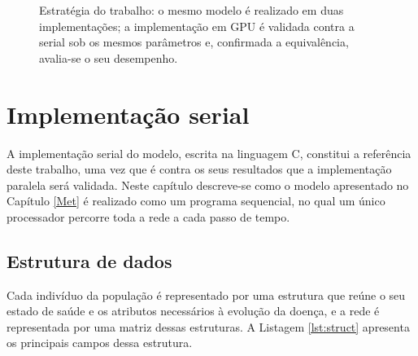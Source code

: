 \documentclass[
	12pt,				%
	openright,			%
	oneside,			%
	a4paper,			%
	english,			%
	french,				%
	spanish,			%
	brazil				%
	]{abntex2}
\begin{document}
\begin{figure}[H]
\centering
{}
\caption{Estratégia do trabalho: o mesmo modelo é realizado em duas implementações; a implementação em GPU é validada contra a serial sob os mesmos parâmetros e, confirmada a equivalência, avalia-se o seu desempenho.}
\label{fig:estrategia}
\end{figure}

\chapter{Implementação serial}
\label{cap:serial}

A implementação serial do modelo, escrita na linguagem C, constitui a referência deste trabalho, uma vez que é contra os seus resultados que a implementação paralela será validada. Neste capítulo descreve-se como o modelo apresentado no Capítulo \ref{Met} é realizado como um programa sequencial, no qual um único processador percorre toda a rede a cada passo de tempo.

\section{Estrutura de dados}

Cada indivíduo da população é representado por uma estrutura que reúne o seu estado de saúde e os atributos necessários à evolução da doença, e a rede é representada por uma matriz dessas estruturas. A Listagem \ref{lst:struct} apresenta os principais campos dessa estrutura.
\end{document}

